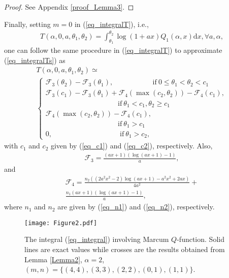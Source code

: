 \begin{proof}
See Appendix \ref{proof_Lemma3}.
\end{proof}

Finally, setting $m = 0$ in (\ref{eq_integralT}), i.e.,
\begin{align}\label{eq_integralTs}
     T(\alpha,0,a,\theta_1,\theta_2) = \int_{\theta_1}^{\theta_2} \log(1+ax)Q_1(\alpha,x)\text{d}x,  \forall a,\alpha,
\end{align}
one can follow the same procedure in (\ref{eq_integralT}) to approximate (\ref{eq_integralTs}) as
\begin{align}\label{eq_integralTss}
  T(\alpha,0,a,\theta_1,\theta_2)\simeq~~~~~~~~~~~~~~~~~~~~~~~~~~~~~~~~~~~~~~~~~~~~~~~~~~\nonumber\\
\begin{cases}
\mathcal{F}_3(\theta_2)-\mathcal{F}_3(\theta_1), ~~~~~~~~~~~~~~~~~~~~~~~~~\mathrm{if}~  0\leq\theta_1<\theta_2 < c_1  \\ 
\mathcal{F}_3(c_1)-\mathcal{F}_3(\theta_1)+\mathcal{F}_4(\max(c_2,\theta_2))-\mathcal{F}_4(c_1),  \\~~~~~~~~~~~~~~~~~~~~~~~~~~~~~~~~~~~~~~~~~~~~~~\mathrm{if}~ \theta_1<c_1, \theta_2\geq c_1\\
 \mathcal{F}_4(\max(c_2,\theta_2))-\mathcal{F}_4(c_1), \\~~~~~~~~~~~~~~~~~~~~~~~~~~~~~~~~~~~~~~~~~~~~~~\mathrm{if}~ \theta_1>c_1\\
0, ~~~~~~~~~~~~~~~~~~~~~~~~~~~~~~~~~~~~~~~~~~~\mathrm{if}~ \theta_1 > c_2,
\end{cases}  
\end{align}
with $c_1$ and $c_2$ given by (\ref{eq_c1}) and (\ref{eq_c2}), respectively. Also,
\begin{align}
    \mathcal{F}_3 = \frac{(ax+1)(\log(ax+1)-1)}{a},
\end{align}
and
\begin{align}
    \mathcal{F}_4 = \frac{n_2\left((2a^2x^2-2)\log(ax+1)-a^2x^2+2ax\right)}{4a^2}+\nonumber\\\frac{n_1(ax+1)(\log(ax+1)-1)}{a},
\end{align}
where $n_1$ and $n_2$ are given by (\ref{eq_n1}) and (\ref{eq_n2}), respectively.


\begin{figure}
\centering
  \texttt{[image: Figure2.pdf]}\\
\caption{The  integral (\ref{eq_integral}) involving Marcum $Q$-function. Solid lines are exact values while crosses are the results obtained from Lemma \ref{Lemma2}, $\alpha = 2$,  $(m,n) = \{(4,4), (3,3), (2,2), (0,1), (1,1)\}$.}\label{fig_integrald}
\end{figure}






